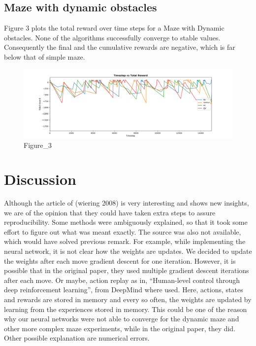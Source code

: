 \hypertarget{maze-with-dynamic-obstacles-1}{%
\subsection{Maze with dynamic
obstacles}\label{maze-with-dynamic-obstacles-1}}

Figure 3 plots the total reward over time steps for a Maze with Dynamic
obstacles. None of the algorithms successfully converge to stable
values. Consequently the final and the cumulative rewards are negative,
which is far below that of simple maze.

\begin{figure}
\centering
\includegraphics{img/Timestep_vs_Total_reward.png}
\caption{Figure\_3}
\end{figure}

\hypertarget{discussion}{%
\section{Discussion}\label{discussion}}

Although the article of (wiering 2008) is very interesting and shows new
insights, we are of the opinion that they could have taken extra steps
to assure reproducibility. Some methods were ambiguously explained, so
that it took some effort to figure out what was meant exactly. The
source was also not available, which would have solved previous remark.
For example, while implementing the neural network, it is not clear how
the weights are updates. We decided to update the weights after each
move gradient descent for one iteration. However, it is possible that in
the original paper, they used multiple gradient descent iterations after
each move. Or maybe, action replay as in, ``Human-level control through
deep reinforcement learning'', from DeepMind where used. Here, actions,
states and rewards are stored in memory and every so often, the weights
are updated by learning from the experiences stored in memory. This
could be one of the reason why our neural networks were not able to
converge for the dynamic maze and other more complex maze experiments,
while in the original paper, they did. Other possible explanation are
numerical errors.

